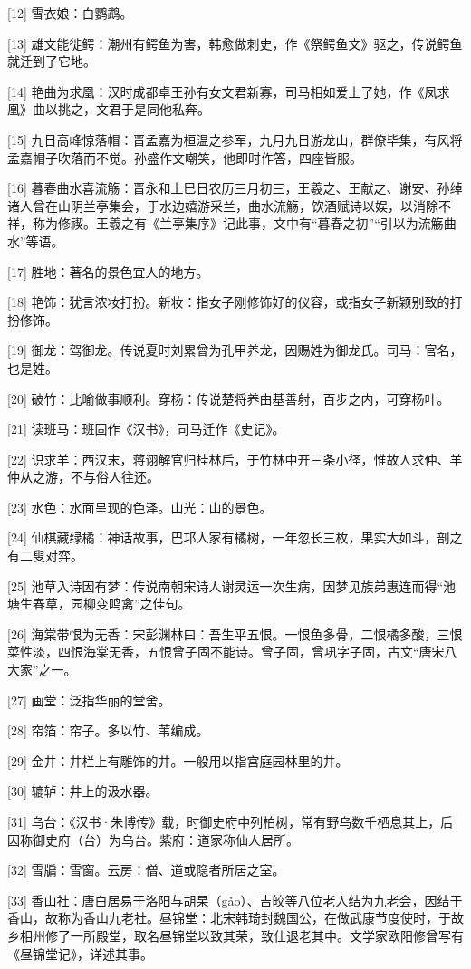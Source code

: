 \documentclass[12pt,UTF8]{ctexbook}
\begin{document}
[12] 雪衣娘：白鹦鹉。

[13] 雄文能徙鳄：潮州有鳄鱼为害，韩愈做刺史，作《祭鳄鱼文》驱之，传说鳄鱼就迁到了它地。

[14] 艳曲为求凰：汉时成都卓王孙有女文君新寡，司马相如爱上了她，作《凤求凰》曲以挑之，文君于是同他私奔。

[15] 九日高峰惊落帽：晋孟嘉为桓温之参军，九月九日游龙山，群僚毕集，有风将孟嘉帽子吹落而不觉。孙盛作文嘲笑，他即时作答，四座皆服。

[16] 暮春曲水喜流觞：晋永和上巳日农历三月初三，王羲之、王献之、谢安、孙绰诸人曾在山阴兰亭集会，于水边嬉游采兰，曲水流觞，饮酒赋诗以娱，以消除不祥，称为修禊。王羲之有《兰亭集序》记此事，文中有“暮春之初”“引以为流觞曲水”等语。

[17] 胜地：著名的景色宜人的地方。

[18] 艳饰：犹言浓妆打扮。新妆：指女子刚修饰好的仪容，或指女子新颖别致的打扮修饰。

[19] 御龙：驾御龙。传说夏时刘累曾为孔甲养龙，因赐姓为御龙氏。司马：官名，也是姓。

[20] 破竹：比喻做事顺利。穿杨：传说楚将养由基善射，百步之内，可穿杨叶。

[21] 读班马：班固作《汉书》，司马迁作《史记》。

[22] 识求羊：西汉末，蒋诩解官归桂林后，于竹林中开三条小径，惟故人求仲、羊仲从之游，不与俗人往还。

[23] 水色：水面呈现的色泽。山光：山的景色。

[24] 仙棋藏绿橘：神话故事，巴邛人家有橘树，一年忽长三枚，果实大如斗，剖之有二叟对弈。

[25] 池草入诗因有梦：传说南朝宋诗人谢灵运一次生病，因梦见族弟惠连而得“池塘生春草，园柳变鸣禽”之佳句。

[26] 海棠带恨为无香：宋彭渊林曰：吾生平五恨。一恨鱼多骨，二恨橘多酸，三恨菜性淡，四恨海棠无香，五恨曾子固不能诗。曾子固，曾巩字子固，古文“唐宋八大家”之一。

[27] 画堂：泛指华丽的堂舍。

[28] 帘箔：帘子。多以竹、苇编成。

[29] 金井：井栏上有雕饰的井。一般用以指宫庭园林里的井。

[30] 辘轳：井上的汲水器。

[31] 乌台：《汉书·朱博传》载，时御史府中列柏树，常有野乌数千栖息其上，后因称御史府（台）为乌台。紫府：道家称仙人居所。

[32] 雪牖：雪窗。云房：僧、道或隐者所居之室。

[33] 香山社：唐白居易于洛阳与胡杲（gǎo）、吉皎等八位老人结为九老会，因结于香山，故称为香山九老社。昼锦堂：北宋韩琦封魏国公，在做武康节度使时，于故乡相州修了一所殿堂，取名昼锦堂以致其荣，致仕退老其中。文学家欧阳修曾写有《昼锦堂记》，详述其事。
\end{document}
